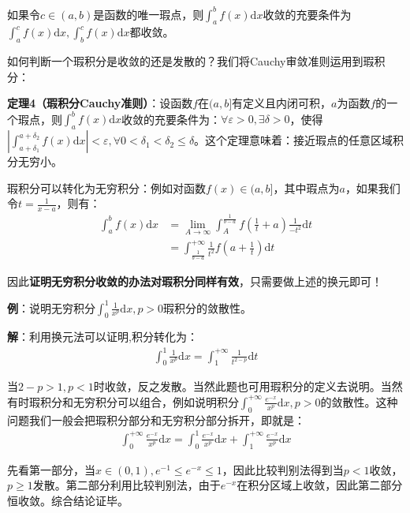 \documentclass{ctexart}
\let\oldtextbf\textbf
\renewcommand{\textbf}[1]{\textcolor{brown!50!red}{\oldtextbf{#1}}}
\begin{document}
如果令$c\in(a,b)$是函数的唯一瑕点，则$\int_a^b f(x)\mathrm{d}x$收敛的充要条件为$\int_a^c f(x)\mathrm{d}x,\int_b^c f(x)\mathrm{d}x$都收敛。

如何判断一个瑕积分是收敛的还是发散的？我们将Cauchy审敛准则运用到瑕积分：
\begin{tcolorbox}[
    colback=bac2,     %
    colframe=fra2,   %
    coltitle=white,             %
    coltext=tex2,
    title=圆角框,
    fonttitle=\bfseries,        %
arc=3mm,                     %
breakable
]
\textbf{\color{brown!50!red}定理4（瑕积分Cauchy准则）}：设函数$f$在$(a,b]$有定义且内闭可积，$a$为函数$f$的一个瑕点，则$\int_a^b f(x)\mathrm{d}x$收敛的充要条件为：$\forall \varepsilon>0,\exists \delta>0$，使得$|\int_{a+\delta_1}^{a+\delta_2}f(x)\mathrm{d}x|<\varepsilon,\forall 0<\delta_1<\delta_2\leq \delta$。这个定理意味着：接近瑕点的任意区域积分无穷小。
\end{tcolorbox}

瑕积分可以转化为无穷积分：例如对函数$f(x)\in(a,b]$，其中瑕点为$a$，如果我们令$t=\frac{1}{x-a}$，则有：
\begin{align*} 
  \int_a^bf(x)\mathrm{d}x&=\lim_{A\to\infty}\int_{A}^{\frac{1}{b-a} } f(\frac{1}{t}+a)\frac{1}{-t^2}\mathrm{d}t\\
&=  \int_\frac{1}{b-a}^{+\infty} \frac{1}{t^2}f(a+\frac{1}{t})\mathrm{d}t   
\end{align*}

因此\textbf{\color{brown!50!red}证明无穷积分收敛的办法对瑕积分同样有效}，只需要做上述的换元即可！

\textbf{\color{brown!50!red}例}：说明无穷积分$\int_0^1 \frac{1}{x^p}\mathrm{d}x,p>0$瑕积分的敛散性。

\textbf{\color{brown!50!red}解}：利用换元法可以证明,积分转化为：
\begin{align*} 
 \int_0^1\frac{1}{x^p} \mathrm{d}x=\int_1^{+\infty}\frac{1}{t^{2-p}}\mathrm{d}t    
\end{align*}

当$2-p>1,p<1$时收敛，反之发散。当然此题也可用瑕积分的定义去说明。当然有时瑕积分和无穷积分可以组合，例如说明积分$\int_0^{+\infty}\frac{e^{-x}}{x^p}\mathrm{d}x,p>0$的敛散性。这种问题我们一般会把瑕积分部分和无穷积分部分拆开，即就是：
\begin{align*} 
\int_0^{+\infty}\frac{e^{-x}}{x^p}\mathrm{d}x=\int_0^{1}\frac{e^{-x}}{x^p}\mathrm{d}x
+\int_1^{+\infty}\frac{e^{-x}}{x^p}\mathrm{d}x
\end{align*}

先看第一部分，当$x\in(0,1),e^{-1}\leq e^{-x}\leq 1$，因此比较判别法得到当$p<1$收敛，$p\geq 1$发散。第二部分利用比较判别法，由于$e^{-x}$在积分区域上收敛，因此第二部分恒收敛。综合结论证毕。
\end{document}
